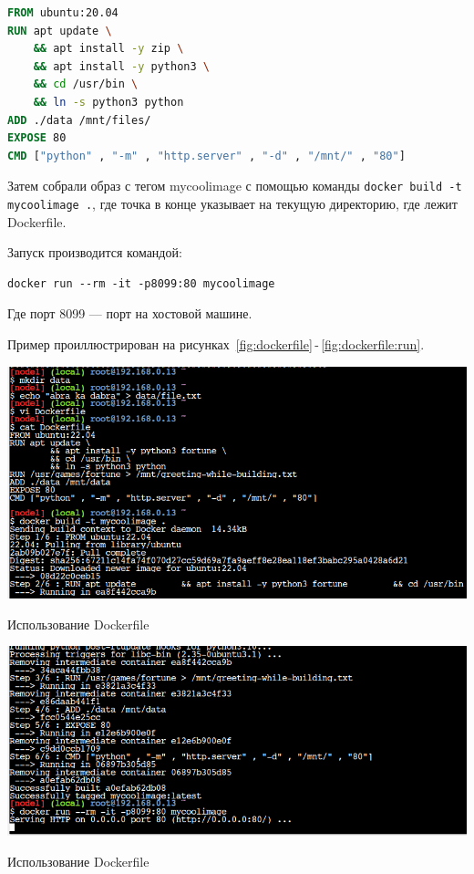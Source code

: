 \begin{lstlisting}[language=Dockerfile
	, caption=\leftline{Код Dockerfile-а}
	, label=lst:dockerfile]
FROM ubuntu:20.04
RUN apt update \
	&& apt install -y zip \
	&& apt install -y python3 \
	&& cd /usr/bin \
	&& ln -s python3 python
ADD ./data /mnt/files/ 
EXPOSE 80
CMD ["python" , "-m" , "http.server" , "-d" , "/mnt/" , "80"]
\end{lstlisting}

Затем собрали образ с тегом mycoolimage с помощью команды
\texttt{docker build -t mycoolimage .}, где точка в конце указывает
на текущую директорию, где лежит Dockerfile.\par
Запуск производится командой:

\begin{verbatim}
docker run --rm -it -p8099:80 mycoolimage
\end{verbatim}

Где порт 8099 --- порт
на хостовой машине.\par
Пример проиллюстрирован
на рисунках~\ref{fig:dockerfile}\,-\,\ref{fig:dockerfile:run}.

\begin{image}
	\includegraphics[width=1\textwidth]{Screenshot from 2023-04-15 21-07-19}
	\caption{Использование Dockerfile}
	\label{fig:dockerfile}
\end{image}

\begin{image}
	\includegraphics[width=1\textwidth]{Screenshot from 2023-04-15 21-08-59}
	\caption{Использование Dockerfile}
	\label{fig:dockerfile:run}
\end{image}

